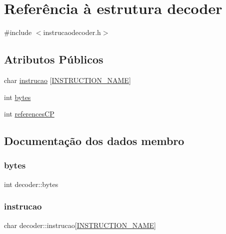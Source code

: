 \hypertarget{struct_mapper}{}\section{Referência à estrutura decoder}
\label{struct_mapper}


{\ttfamily \#include $<$instrucao\+decoder.\+h$>$}

\subsection*{Atributos Públicos}
\begin{DoxyCompactItemize}
\item 
char \hyperlink{struct_mapper_accd08fb22057870b05be442ff0a4f580}{instrucao} \mbox{[}\hyperlink{instruction_mapper_8h_ab77522c65df7d18cddc66f4f74a47f29}{I\+N\+S\+T\+R\+U\+C\+T\+I\+O\+N\+\_\+\+N\+A\+ME}\mbox{]}
\item 
int \hyperlink{struct_mapper_a03ccd2444e65aa0b113fb0f97b73f6f6}{bytes}
\item 
int \hyperlink{struct_mapper_af2d2cc85289235cb8ba33cb807404241}{references\+CP}
\end{DoxyCompactItemize}


\subsection{Documentação dos dados membro}
\hypertarget{struct_mapper_a03ccd2444e65aa0b113fb0f97b73f6f6}{}\label{struct_mapper_a03ccd2444e65aa0b113fb0f97b73f6f6} 
\subsubsection{\texorpdfstring{bytes}{bytes}}
{\footnotesize\ttfamily int decoder\+::bytes}

\hypertarget{struct_mapper_accd08fb22057870b05be442ff0a4f580}{}\label{struct_mapper_accd08fb22057870b05be442ff0a4f580} 
\subsubsection{\texorpdfstring{instrucao}{instrucao}}
{\footnotesize\ttfamily char decoder\+::instrucao\mbox{[}\hyperlink{instruction_mapper_8h_ab77522c65df7d18cddc66f4f74a47f29}{I\+N\+S\+T\+R\+U\+C\+T\+I\+O\+N\+\_\+\+N\+A\+ME}\mbox{]}}

